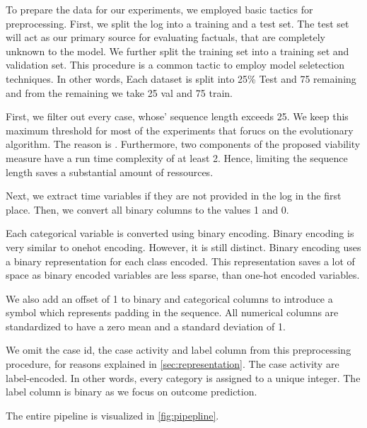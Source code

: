 \documentclass[./../../paper.tex]{subfiles}
\begin{document}
To prepare the data for our experiments, we employed basic tactics for preprocessing. First, we split the log into a training and a test set. The test set will act as our primary source for evaluating factuals, that are completely unknown to the model. We further split the training set into a training set and validation set. This procedure is a common tactic to employ model seletection techniques.  In other words, Each dataset is split into 25\% Test and 75 remaining and from the remaining we take 25 val and 75 train.

First, we filter out every case, whose' sequence length exceeds 25.  We keep this maximum threshold for most of the experiments that forucs on the evolutionary algorithm. The reason is . Furthermore, two components of the proposed viability measure have a run time complexity of at least 2. Hence, limiting the sequence length saves a substantial amount of ressources.

Next, we extract time variables if they are not provided in the log in the first place. Then, we convert all binary columns to the values 1 and 0. 

Each categorical variable is converted using binary encoding. Binary encoding is very similar to onehot encoding. However, it is still distinct. Binary encoding uses a binary representation for each class encoded. This representation saves a lot of space as binary encoded variables are less sparse, than one-hot encoded variables.

We also add an offset of 1 to binary and categorical columns to introduce a symbol which represents padding in the sequence. All numerical columns are standardized to have a zero mean and a standard deviation of 1.

We omit the case id, the case activity and label column from this preprocessing procedure, for reasons explained in \autoref{sec:representation}. The case activity are label-encoded. In other words, every category is assigned to a unique integer. The label column is binary as we focus on outcome prediction.

The entire pipeline is visualized in \autoref{fig:pipepline}.

\end{document}

